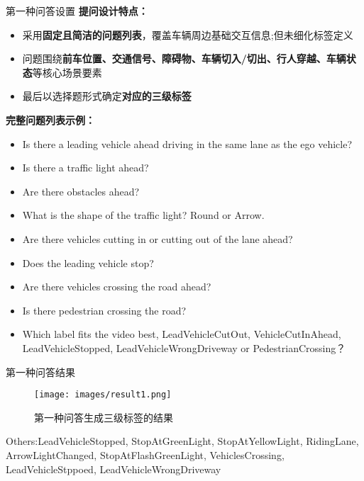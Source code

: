 \documentclass[serif]{beamer}
\begin{document}
\begin{frame}{第一种问答设置}
\textbf{提问设计特点：}
\begin{itemize}
  \item 采用\textbf{固定且简洁的问题列表}，覆盖车辆周边基础交互信息;但未细化标签定义
  \item 问题围绕\textbf{前车位置、交通信号、障碍物、车辆切入/切出、行人穿越、车辆状态}等核心场景要素
  \item 最后以选择题形式确定\textbf{对应的三级标签}
\end{itemize}

\vspace{0.6em}
\textbf{完整问题列表示例：}

\footnotesize
\begin{itemize}
  \item Is there a leading vehicle ahead driving in the same lane as the ego vehicle?
  \item Is there a traffic light ahead?
  \item Are there obstacles ahead?
  \item What is the shape of the traffic light? Round or Arrow.
  \item Are there vehicles cutting in or cutting out of the lane ahead?
  \item Does the leading vehicle stop?
  \item Are there vehicles crossing the road ahead?
  \item Is there pedestrian crossing the road?
  \item Which label fits the video best, LeadVehicleCutOut, VehicleCutInAhead, LeadVehicleStopped, LeadVehicleWrongDriveway or PedestrianCrossing？
\end{itemize}
\normalsize

\end{frame}

\begin{frame}{第一种问答结果}

\begin{figure}
    \centering
    \texttt{[image: images/result1.png]}
    \caption{第一种问答生成三级标签的结果}
\end{figure}

\scriptsize
Others:LeadVehicleStopped, StopAtGreenLight, StopAtYellowLight, RidingLane, ArrowLightChanged, StopAtFlashGreenLight, VehiclesCrossing, LeadVehicleStppoed, LeadVehicleWrongDriveway    
\normalsize
\end{frame}
\end{document}
